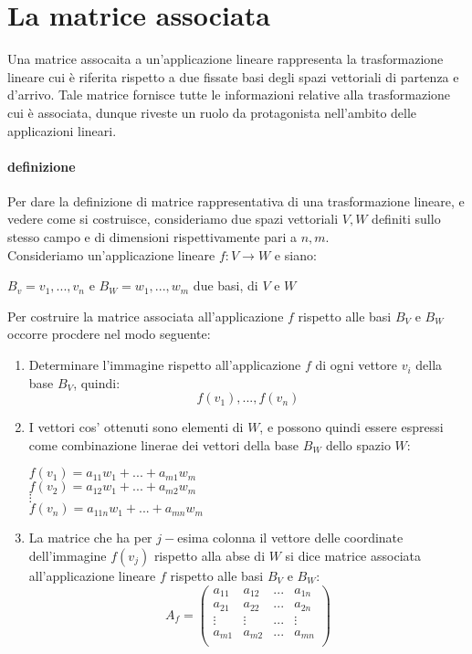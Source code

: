 \section{La matrice associata}
Una matrice assocaita a un'applicazione lineare rappresenta la trasformazione lineare cui è riferita rispetto a due fissate basi degli spazi vettoriali di partenza e d'arrivo.
Tale matrice fornisce tutte le informazioni relative alla trasformazione cui è associata, dunque riveste un ruolo da protagonista nell'ambito delle applicazioni lineari.

\paragraph{definizione}
Per dare la definizione di matrice rappresentativa di una trasformazione lineare, e vedere come si costruisce, consideriamo due spazi vettoriali $V,W$ definiti sullo stesso campo e di dimensioni rispettivamente pari a $n,m$.
\\Consideriamo un'applicazione lineare $f:V\to W$ e siano:
\begin{center}
	$B_v = {v_1,...,v_n}$ e $B_W={w_1,...,w_m}$ due basi, di $V$ e $W$
\end{center}
Per costruire la matrice associata all'applicazione $f$ rispetto alle basi $B_V$ e $B_W$ occorre procdere nel modo seguente:
\begin{enumerate}
	\item Determinare l'immagine rispetto all'applicazione $f$ di ogni vettore $v_i$ della base $B_V$, quindi:
	      \[ f(v_1),...,f(v_n)\]
	\item I vettori cos' ottenuti sono elementi di $W$, e possono quindi essere espressi come combinazione linerae dei vettori della base $B_W$ dello spazio $W$:
	\begin{center}
        $f(v_1) = a_{11}w_1 + ... + a_{m1}w_m $
        \\ $f(v_2) = a_{12}w_1 + ... + a_{m2}w_m $
        \\$ \vdots$
        \\$f(v_n) = a_{11n}w_1 + ... + a_{mn}w_m $
    \end{center}
    \item La matrice che ha per $j-$esima colonna il vettore delle coordinate dell'immagine $f(v_j)$ rispetto alla abse di $W$ si dice matrice associata all'applicazione lineare $f$ rispetto alle basi $B_V$ e $B_W$:
    \[ A_f = 
        \begin{pmatrix}
            a_{11} & a_{12} & ... & a_{1n} \\
            a_{21} & a_{22} & ... & a_{2n} \\
            \vdots & \vdots & ... & \vdots \\
            a_{m1} & a_{m2} & ... & a_{mn} \\
        \end{pmatrix}
    \]
\end{enumerate}